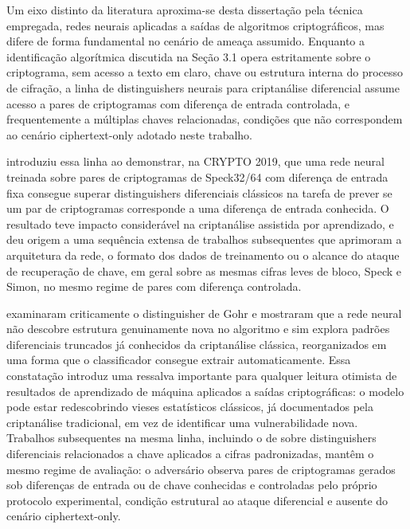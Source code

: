 Um eixo distinto da literatura aproxima-se desta dissertação pela técnica empregada, redes neurais aplicadas a saídas de algoritmos criptográficos, mas difere de forma fundamental no cenário de ameaça assumido. Enquanto a identificação algorítmica discutida na Seção 3.1 opera estritamente sobre o criptograma, sem acesso a texto em claro, chave ou estrutura interna do processo de cifração, a linha de distinguishers neurais para criptanálise diferencial assume acesso a pares de criptogramas com diferença de entrada controlada, e frequentemente a múltiplas chaves relacionadas, condições que não correspondem ao cenário ciphertext-only adotado neste trabalho.

 introduziu essa linha ao demonstrar, na CRYPTO 2019, que uma rede neural treinada sobre pares de criptogramas de Speck32/64 com diferença de entrada fixa consegue superar distinguishers diferenciais clássicos na tarefa de prever se um par de criptogramas corresponde a uma diferença de entrada conhecida. O resultado teve impacto considerável na criptanálise assistida por aprendizado, e deu origem a uma sequência extensa de trabalhos subsequentes que aprimoram a arquitetura da rede, o formato dos dados de treinamento ou o alcance do ataque de recuperação de chave, em geral sobre as mesmas cifras leves de bloco, Speck e Simon, no mesmo regime de pares com diferença controlada.

 examinaram criticamente o distinguisher de Gohr e mostraram que a rede neural não descobre estrutura genuinamente nova no algoritmo e sim explora padrões diferenciais truncados já conhecidos da criptanálise clássica, reorganizados em uma forma que o classificador consegue extrair automaticamente. Essa constatação introduz uma ressalva importante para qualquer leitura otimista de resultados de aprendizado de máquina aplicados a saídas criptográficas: o modelo pode estar redescobrindo vieses estatísticos clássicos, já documentados pela criptanálise tradicional, em vez de identificar uma vulnerabilidade nova. Trabalhos subsequentes na mesma linha, incluindo o de  sobre distinguishers diferenciais relacionados a chave aplicados a cifras padronizadas, mantêm o mesmo regime de avaliação: o adversário observa pares de criptogramas gerados sob diferenças de entrada ou de chave conhecidas e controladas pelo próprio protocolo experimental, condição estrutural ao ataque diferencial e ausente do cenário ciphertext-only.

